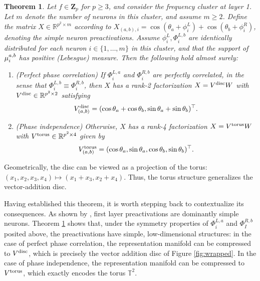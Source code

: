 \documentclass{article} %
\theoremstyle{plain}
\newtheorem{theorem}{Theorem}[section]
\theoremstyle{definition}
\newtheorem{empirical fact}[theorem]{Empirical Fact}
\begin{document}
\begin{theorem}
    \label{thm:disc-torus}
    Let $f\in\mathbf{Z}_p$ for $p\geq 3$, and consider the frequency cluster at layer 1.
    Let $m$ denote the number of neurons in this cluster, and assume $m\geq 2$.
    Define the matrix $X\in\mathbb{R}^{p^2\times m}$ according to $X_{(a, b), i} = \cos(\theta_a + \phi^L_i) + \cos(\theta_b + \phi^R_i)$, denoting the simple neuron preactivations.
    Assume $\phi^L_i, \Phi^{L, b}_i$ are identically distributed for each neuron $i\in\{1,\dots,m\}$ in this cluster, and that the support of $\mu_{i}^{a, b}$ has positive (Lebesgue) measure. Then the following hold almost surely:
    \begin{enumerate}
        \item\emph{(Perfect phase correlation)} If $\Phi_i^{L, a}$ and $\Phi_i^{R, b}$ are perfectly correlated, in the sense that $\Phi_i^{L, b} \equiv \Phi_i^{R, b}$, then $X$ has a rank-2 factorization $X = V^{\rm disc}W$ with $V^{\rm disc}\in\mathbb{R}^{p^2\times 2}$ satisfying
        \begin{equation}\label{eq:factorization:disc}
            V^{\rm disc}_{(a, b)} = (\cos\theta_a + \cos\theta_b, \sin\theta_a + \sin\theta_b)^\top.
        \end{equation}
        \item\emph{(Phase independence)} Otherwise, $X$ has a rank-4 factorization $X = V^{\rm torus}W$ with $V^{\rm torus}\in\mathbb{R}^{p^2\times 4}$ given by
        \begin{equation}\label{eq:factorization:torus}
            V^{\rm torus}_{(a, b)} = (\cos\theta_a, \sin\theta_a, \cos\theta_b, \sin\theta_b)^\top.
        \end{equation}
    \end{enumerate}
\end{theorem}

Geometrically, the disc can be viewed as a projection of the torus: $(x_1, x_2, x_3, x_4) \mapsto (x_1 + x_3, x_2 + x_4)$. Thus, the torus structure generalizes the vector-addition disc.

Having established this theorem, it is worth stepping back to contextualize its consequences.
As shown by \citet{mccracken2025uncoveringuniversalabstractalgorithm}, first layer preactivations are dominantly simple neurons.
Theorem \ref{thm:disc-torus} shows that, under the symmetry properties of $\Phi_i^{L, a}$ and $\Phi_I^{R, b}$ posited above, the preactivations have simple, low-dimensional structures: in the case of perfect phase correlation, the representation manifold can be compressed to $V^{\rm disc}$, which is precisely the vector addition disc of Figure \ref{fig:wrapped}.
In the case of phase independence, the representation manifold can be compressed to $V^{\rm torus}$, which exactly encodes the torus $\mathbb{T}^2$.
\end{document}
